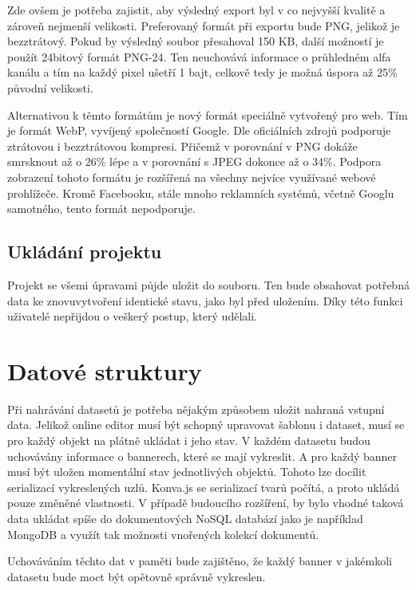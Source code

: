         Zde ovšem je potřeba zajistit, aby výsledný export byl v co nejvyšší kvalitě a zároveň nejmenší velikosti.
        Preferovaný formát při exportu bude PNG, jelikož je bezztrátový. Pokud by výsledný soubor přesahoval 150 KB,
        další možností je použít 24bitový formát PNG-24.
        Ten neuchovává informace o průhledném alfa kanálu a tím na každý pixel ušetří 1 bajt, celkově tedy je možná úspora až 25\% původní velikosti. 

        Alternativou k těmto formátům je nový formát speciálně vytvořený pro web. Tím je formát WebP, vyvíjený společností Google.
        Dle oficiálních zdrojů podporuje ztrátovou i bezztrátovou kompresi. Přičemž v porovnání v PNG dokáže smrsknout až o 26\% lépe a v porovnání
        s JPEG dokonce až o 34\%. Podpora zobrazení tohoto formátu je rozšířená na všechny nejvíce využívané webové prohlížeče.
        Kromě Facebooku, stále mnoho reklamních systémů, včetně Googlu samotného, tento formát nepodporuje.

        \subsection{Ukládání projektu}
        Projekt se všemi úpravami půjde uložit do souboru. Ten bude obsahovat potřebná data ke znovuvytvoření identické stavu, jako byl před uložením.
        Díky této funkci uživatelé nepřijdou o veškerý postup, který udělali.

    \section{Datové struktury}
    Při nahrávání datasetů je potřeba nějakým způsobem uložit nahraná vstupní data. Jelikož online editor musí být schopný upravovat šablonu i dataset,
    musí se pro každý objekt na plátně ukládat i jeho stav. V každém datasetu budou uchovávány informace o bannerech, které se mají vykreslit.
    A pro každý banner musí být uložen momentální stav jednotlivých objektů. Tohoto lze docílit serializací vykreslených uzlů.
    Konva.js se serializací tvarů počítá, a proto ukládá pouze změněné vlastnosti. V případě budoucího rozšíření, by bylo vhodné taková data ukládat spíše do
    dokumentových NoSQL databází jako je například MongoDB a využít tak možnosti vnořených kolekcí dokumentů. 

    Uchováváním těchto dat v paměti bude zajištěno, že každý banner v jakémkoli datasetu bude moct být opětovně správně vykreslen.

